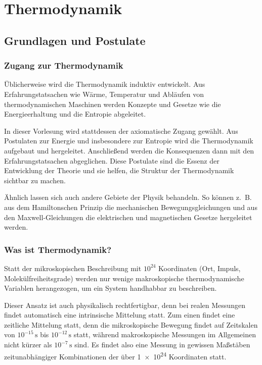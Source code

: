 
\part{Thermodynamik}

\chapter{Grundlagen und Postulate}
\section{Zugang zur Thermodynamik}

Üblicherweise wird die Thermodynamik induktiv entwickelt. Aus Erfahrungstatsachen wie Wärme, Temperatur und Abläufen von thermodynamischen Maschinen werden Konzepte und Gesetze wie die Energieerhaltung und die Entropie abgeleitet.

In dieser Vorlesung wird stattdessen der axiomatische Zugang gewählt.
Aus Postulaten zur Energie und insbesondere zur Entropie wird die Thermodynamik aufgebaut und hergeleitet.
Anschließend werden die Konsequenzen dann mit den Erfahrungstatsachen abgeglichen.
Diese Postulate sind die Essenz der Entwicklung der Theorie und sie helfen, die Struktur der Thermodynamik sichtbar zu machen.

Ähnlich lassen sich auch andere Gebiete der Physik behandeln.
So können z.~B. aus dem Hamiltonschen Prinzip die mechanischen Bewegungsgleichungen und aus den Maxwell-Gleichungen die elektrischen und magnetischen Gesetze hergeleitet werden.


\section{Was ist Thermodynamik?}

Statt der mikroskopischen Beschreibung mit $10^{24}$ Koordinaten (Ort, Impuls, Molekülfreiheitsgrade) werden nur wenige makroskopische thermodynamische Variablen herangezogen, um ein System handhabbar zu beschreiben.

Dieser Ansatz ist auch physikalisch rechtfertigbar, denn bei realen Messungen findet automatisch eine intrinsische Mittelung statt.
Zum einen findet eine zeitliche Mittelung statt, denn die mikroskopische Bewegung findet auf Zeitskalen von $10^{-15}\,\si{\s}$ bis $10^{-12}\,\si{\s}$ statt, während makroskopische Messungen im Allgemeinen nicht kürzer als $10^{-7}\,\si{\s}$ sind.
Es findet also eine Messung in gewissen Maßstäben zeitunabhängiger Kombinationen der über \num{1e24} Koordinaten statt.


